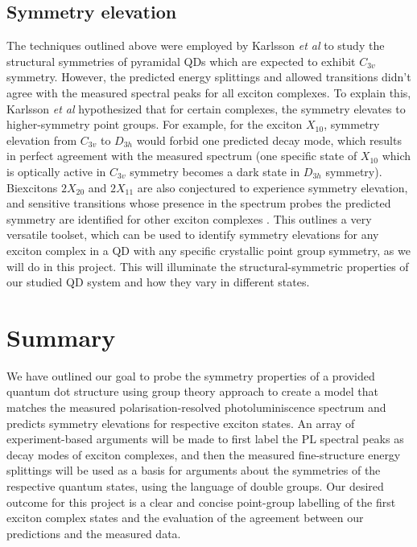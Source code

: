 \documentclass[12pt]{article}
\begin{document}
\subsection{Symmetry elevation}
The techniques outlined above were employed by Karlsson \textit{et al} to study the structural symmetries of pyramidal QDs which are expected to exhibit $C_{3v}$ symmetry. However, the predicted energy splittings and allowed transitions didn't agree with the measured spectral peaks for all exciton complexes. To explain this, Karlsson \textit{et al} hypothesized that for certain complexes, the symmetry elevates to higher-symmetry point groups. For example, for the exciton $X_{10}$, symmetry elevation from $C_{3v}$ to $D_{3h}$ would forbid one predicted decay mode, which results in perfect agreement with the measured spectrum (one specific state of $X_{10}$ which is optically active in $C_{3v}$ symmetry becomes a dark state in $D_{3h}$ symmetry). Biexcitons $2X_{20}$ and $2X_{11}$ are also conjectured to experience symmetry elevation, and sensitive transitions whose presence in the spectrum probes the predicted symmetry are identified for other exciton complexes \cite{karlsson}. This outlines a very versatile toolset, which can be used to identify symmetry elevations for any exciton complex in a QD with any specific crystallic point group symmetry, as we will do in this project. This will illuminate the structural-symmetric properties of our studied QD system and how they vary in different states.

\section{Summary}
We have outlined our goal to probe the symmetry properties of a provided quantum dot structure using group theory approach to create a model that matches the measured polarisation-resolved photoluminiscence spectrum and predicts symmetry elevations for respective exciton states. An array of experiment-based arguments will be made to first label the PL spectral peaks as decay modes of exciton complexes, and then the measured fine-structure energy splittings will be used as a basis for arguments about the symmetries of the respective quantum states, using the language of double groups. Our desired outcome for this project is a clear and concise point-group labelling of the first exciton complex states and the evaluation of the agreement between our predictions and the measured data.
\end{document}
